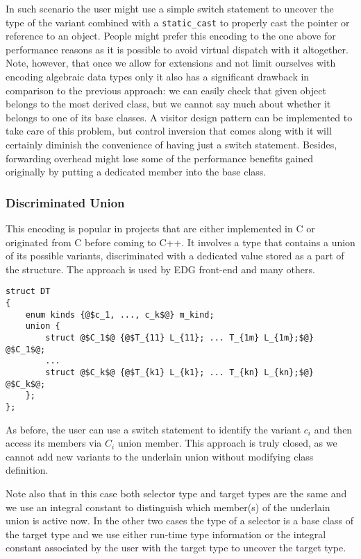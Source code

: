 \documentclass[preprint]{sigplanconf}
\makeatletter
\DeclareRobustCommand{\code}[1]{{\lstinline[breaklines=false,escapechar=@]{#1}}}
\makeatother
\begin{document}
In such scenario the user might use a simple switch statement to uncover the 
type of the variant combined with a \code{static_cast} to properly cast the 
pointer or reference to an object. People might prefer this encoding to the one 
above for performance reasons as it is possible to avoid virtual dispatch with 
it altogether. Note, however, that once we allow for extensions and not limit 
ourselves with encoding algebraic data types only it also has a significant 
drawback in comparison to the previous approach: we can easily check that given 
object belongs to the most derived class, but we cannot say much about whether 
it belongs to one of its base classes. A visitor design pattern can be 
implemented to take care of this problem, but control inversion that comes along 
with it will certainly diminish the convenience of having just a switch 
statement. Besides, forwarding overhead might lose some of the performance 
benefits gained originally by putting a dedicated member into the base class.

\subsubsection{Discriminated Union}
\label{sec:du}

This encoding is popular in projects that are either implemented in C or 
originated from C before coming to C++. It involves a type that contains a union 
of its possible variants, discriminated with a dedicated value stored as a part 
of the structure. The approach is used by EDG front-end\cite{EDG} and many others.

\begin{lstlisting}[keepspaces,columns=flexible]
struct DT
{
    enum kinds {@$c_1, ..., c_k$@} m_kind;
    union {
        struct @$C_1$@ {@$T_{11} L_{11}; ... T_{1m} L_{1m};$@} @$C_1$@;
        ...
        struct @$C_k$@ {@$T_{k1} L_{k1}; ... T_{kn} L_{kn};$@} @$C_k$@; 
    };
};
\end{lstlisting}

As before, the user can use a switch statement to identify the variant $c_i$ and 
then access its members via $C_i$ union member. This approach is truly closed, as 
we cannot add new variants to the underlain union without modifying class 
definition. 

Note also that in this case both selector type and target types are the same and 
we use an integral constant to distinguish which member(s) of the underlain union 
is active now. In the other two cases the type of a selector is a base class of 
the target type and we use either run-time type information or the integral 
constant associated by the user with the target type to uncover the target type. 
\end{document}
